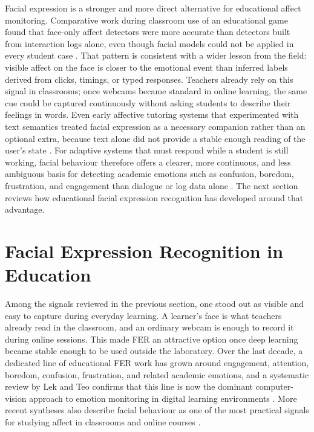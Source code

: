 Facial expression is a stronger and more direct alternative for educational affect monitoring. Comparative work during classroom use of an educational game found that face-only affect detectors were more accurate than detectors built from interaction logs alone, even though facial models could not be applied in every student case \cite{bosch_2015}. That pattern is consistent with a wider lesson from the field: visible affect on the face is closer to the emotional event than inferred labels derived from clicks, timings, or typed responses. Teachers already rely on this signal in classrooms; once webcams became standard in online learning, the same cue could be captured continuously without asking students to describe their feelings in words. Even early affective tutoring systems that experimented with text semantics treated facial expression as a necessary companion rather than an optional extra, because text alone did not provide a stable enough reading of the user's state \cite{lin_employing_2012}. For adaptive systems that must respond while a student is still working, facial behaviour therefore offers a clearer, more continuous, and less ambiguous basis for detecting academic emotions such as confusion, boredom, frustration, and engagement than dialogue or log data alone \cite{lek_academic_2023,vistorte_integrating_2024,petrovica_emotion_2016}. The next section reviews how educational facial expression recognition has developed around that advantage.

\section{Facial Expression Recognition in Education}\label{sec:fer_in_education}

Among the signals reviewed in the previous section, one stood out as visible and easy to capture during everyday learning. A learner's face is what teachers already read in the classroom, and an ordinary webcam is enough to record it during online sessions. This made \ac{FER} an attractive option once deep learning became stable enough to be used outside the laboratory. Over the last decade, a dedicated line of educational FER work has grown around engagement, attention, boredom, confusion, frustration, and related academic emotions, and a systematic review by Lek and Teo confirms that this line is now the dominant computer-vision approach to emotion monitoring in digital learning environments \cite{lek_academic_2023}. More recent syntheses also describe facial behaviour as one of the most practical signals for studying affect in classrooms and online courses \cite{vistorte_integrating_2024,florestiyanto_emotion_2024}.

